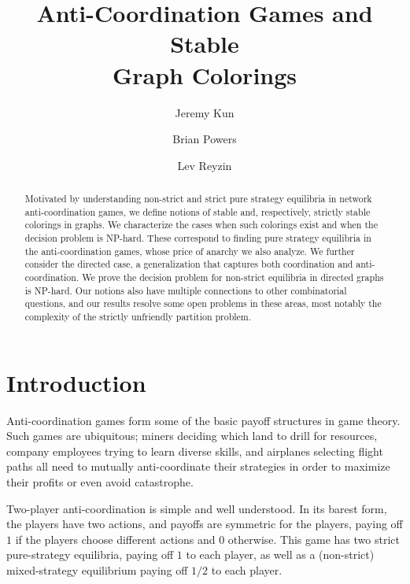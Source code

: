 \documentclass{llncs}
\title{Anti-Coordination Games and Stable \\Graph Colorings}
\begin{document}
\author{Jeremy Kun \and Brian Powers \and Lev Reyzin}


\maketitle


\begin{abstract}
Motivated by understanding non-strict and strict pure strategy equilibria in
network anti-coordination games, we define notions of stable and, respectively,
strictly stable colorings in graphs.  We characterize the cases when such
colorings exist and when the decision problem is NP-hard. These correspond to
finding pure strategy equilibria in the anti-coordination games, whose price of
anarchy we also analyze.  We further consider the directed case, a
generalization that captures both coordination and anti-coordination. We prove
the decision problem for non-strict equilibria in directed graphs is NP-hard.
Our notions also have multiple connections to other combinatorial questions,
and our results resolve some open problems in these areas, most notably the
complexity of the strictly unfriendly partition problem.
\end{abstract}

\section{Introduction}

Anti-coordination games form some of the basic payoff structures in game
theory.  Such games are ubiquitous; miners deciding which land to drill for
resources, company employees trying to learn diverse skills, and airplanes
selecting flight paths all need to mutually anti-coordinate their strategies in
order to maximize their profits or even avoid catastrophe.

Two-player anti-coordination is simple and well understood.  In its barest
form, the players have two actions, and payoffs are symmetric for the players,
paying off $1$ if the players choose different actions and $0$ otherwise.  This
game has two strict pure-strategy equilibria, paying off $1$ to each player, as
well as a (non-strict) mixed-strategy equilibrium paying off $1/2$ to each
player.
\end{document}
